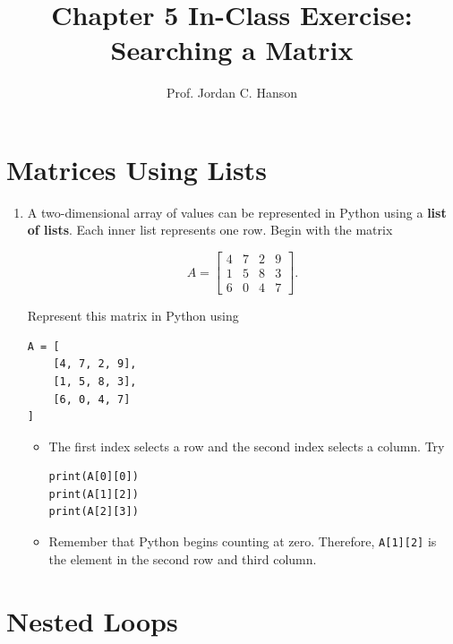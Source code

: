 \documentclass{article}
\begin{document}
\twocolumn

\title{Chapter 5 In-Class Exercise: Searching a Matrix}
\author{Prof. Jordan C. Hanson}
\date{}

\maketitle

\section{Matrices Using Lists}

\begin{enumerate}

\item A two-dimensional array of values can be represented in Python
using a \textbf{list of lists}.  Each inner list represents one row.  Begin with the matrix

\[
A =
\begin{bmatrix}
4 & 7 & 2 & 9 \\
1 & 5 & 8 & 3 \\
6 & 0 & 4 & 7
\end{bmatrix}.
\]

Represent this matrix in Python using

\begin{verbatim}
A = [
    [4, 7, 2, 9],
    [1, 5, 8, 3],
    [6, 0, 4, 7]
]
\end{verbatim}

\begin{itemize}

\item The first index selects a row and the second index selects a column.  Try

\begin{verbatim}
print(A[0][0])
print(A[1][2])
print(A[2][3])
\end{verbatim}

\item Remember that Python begins counting at zero.  Therefore, \texttt{A[1][2]} is the element in the second row and third column.

\end{itemize}

\end{enumerate}


\section{Nested Loops}
\end{document}
